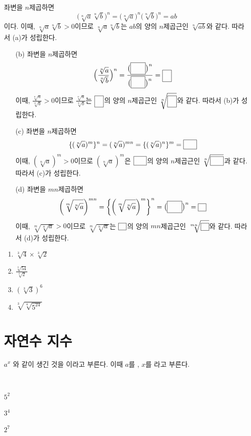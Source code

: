 \documentclass{oblivoir}
\begin{document}
%
\label{property3}
좌변을 \(n\)제곱하면
\[\big(\sqrt[n]a\sqrt[n]b\big)^n=\big(\sqrt[n]a\big)^n\big(\sqrt[n]b\big)^n=ab\]
이다.
이때, \(\sqrt[n]a\sqrt[n]b>0\)이므로
\(\sqrt[n]a\sqrt[n]b\)는 \(ab\)의 양의 \(n\)제곱근인 \(\sqrt[n]{ab}\)와 같다.
따라서 (a)가 성립한다.

%
\label{property4}
\begin{mdframed}
\begin{enumerate}
\item[(b)]
좌변을 \(n\)제곱하면
\[\Big(\frac{\sqrt[n]a}{\sqrt[n]b}\Big)^n=\frac{\big(\pb{\sqrt[n]a}\big)^n}{\big(\pb{\sqrt[n]b}\big)^n}=\pb{\frac ab}\]
이때, \(\frac{\sqrt[n]a}{\sqrt[n]b}>0\)이므로
\(\frac{\sqrt[n]a}{\sqrt[n]b}\)는 \(\pb{\frac ab}\)의 양의 \(n\)제곱근인 \(\sqrt[n]{\pb{\frac ab}}\)와 같다.
따라서 (b)가 성립한다.
\item[(c)]
좌변을 \(n\)제곱하면
\[\{(\sqrt[n]a)^m\}^n=(\sqrt[n]a)^{mn}=\{(\sqrt[n]a)^n\}^m=\pb{a^m}\]
이때, \((\sqrt[n]a)^m>0\)이므로 \((\sqrt[n]a)^m\)은 \(\pb{a^m}\)의 양의 \(n\)제곱근인 \(\sqrt[n]{\pb{a^m}}\)과 같다.
따라서 (c)가 성립한다.
\item[(d)]
좌변을 \(mn\)제곱하면
\[\left(\sqrt[m]{\sqrt[n]a}\right)^{mn}
=\left\{\left(\sqrt[m]{\sqrt[n]a}\right)^m\right\}^n
=\big(\pb{\sqrt[n]a}\big)^n
=\pb a
\]
이때, \(\sqrt[m]{\sqrt[n]a}>0\)이므로 \(\sqrt[m]{\sqrt[n]a}\)는 \(\pb a\)의 양의 \(mn\)제곱근인 \(\sqrt[mn]{\pb a}\)와 같다.
따라서 (d)가 성립한다.
\end{enumerate}
\end{mdframed}

%
\begin{enumerate}\label{property5}
\item
\(\sqrt[3]4\times\sqrt[3]2\)
\item
\(\displaystyle\frac{\sqrt[3]{54}}{\sqrt[3]2}\)
\item
\(\left(\sqrt[3]3\right)^6\)
\item
\(\sqrt[3]{\sqrt[4]{5^{24}}}\)
\end{enumerate}
\newpage

\section{자연수 지수}
\(a^x\)
와 같이 생긴 것을 이라고 부른다.
이때 \(a\)를 , \(x\)를 라고 부른다.

%
\label{natural1}
\\[-10pt]
\begin{enumerate*}[itemjoin=\hspace{0.25\textwidth}]
\item
\(5^2\)
\item
\(3^4\)
\item
\(2^7\)
\end{enumerate*}
\end{document}
